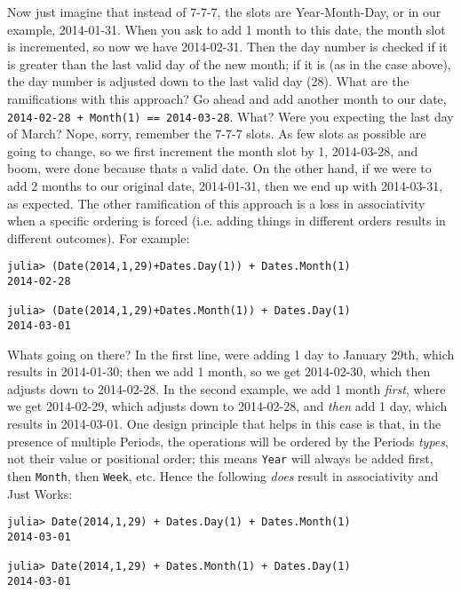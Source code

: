 Now just imagine that instead of 7-7-7, the slots are Year-Month-Day, or in our example, 2014-01-31. When you ask to add 1 month to this date, the month slot is incremented, so now we have 2014-02-31. Then the day number is checked if it is greater than the last valid day of the new month; if it is (as in the case above), the day number is adjusted down to the last valid day (28). What are the ramifications with this approach? Go ahead and add another month to our date, \texttt{2014-02-28 + Month(1) == 2014-03-28}. What? Were you expecting the last day of March? Nope, sorry, remember the 7-7-7 slots. As few slots as possible are going to change, so we first increment the month slot by 1, 2014-03-28, and boom, we{\textquotesingle}re done because that{\textquotesingle}s a valid date. On the other hand, if we were to add 2 months to our original date, 2014-01-31, then we end up with 2014-03-31, as expected. The other ramification of this approach is a loss in associativity when a specific ordering is forced (i.e. adding things in different orders results in different outcomes). For example:




\begin{verbatim}
julia> (Date(2014,1,29)+Dates.Day(1)) + Dates.Month(1)
2014-02-28

julia> (Date(2014,1,29)+Dates.Month(1)) + Dates.Day(1)
2014-03-01
\end{verbatim}



What{\textquotesingle}s going on there? In the first line, we{\textquotesingle}re adding 1 day to January 29th, which results in 2014-01-30; then we add 1 month, so we get 2014-02-30, which then adjusts down to 2014-02-28. In the second example, we add 1 month \emph{first}, where we get 2014-02-29, which adjusts down to 2014-02-28, and \emph{then} add 1 day, which results in 2014-03-01. One design principle that helps in this case is that, in the presence of multiple Periods, the operations will be ordered by the Periods{\textquotesingle} \emph{types}, not their value or positional order; this means \texttt{Year} will always be added first, then \texttt{Month}, then \texttt{Week}, etc. Hence the following \emph{does} result in associativity and Just Works:




\begin{verbatim}
julia> Date(2014,1,29) + Dates.Day(1) + Dates.Month(1)
2014-03-01

julia> Date(2014,1,29) + Dates.Month(1) + Dates.Day(1)
2014-03-01
\end{verbatim}



